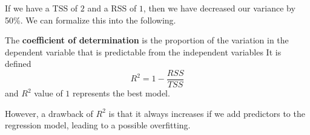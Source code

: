   If we have a TSS of $2$ and a RSS of $1$, then we have decreased our variance by 50\%. We can formalize this into the following. 

  \begin{definition}
    \label{def:coefficient-of-determination}
    The \textbf{coefficient of determination} is the proportion of the variation in the dependent variable that is predictable from the independent variables It is defined 
    \begin{equation}
      R^2 = 1 - \frac{RSS}{TSS}
    \end{equation}
    and $R^2$ value of $1$ represents the best model. 
  \end{definition}

  However, a drawback of $R^2$ is that it always increases if we add predictors to the regression model, leading to a possible overfitting. 

